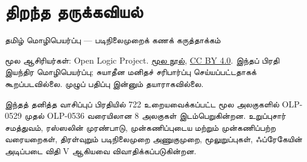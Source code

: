 \documentclass[11pt,a4paper,openany]{memoir}
\begin{document}
\raggedright
\pagestyle{plain}
\chapter*{திறந்த தருக்கவியல்}
\noindent தமிழ் மொழிபெயர்ப்பு — படிநிலைமுறைக் கணக் கருத்தாக்கம்

\noindent மூல ஆசிரியர்கள்: Open Logic Project.
\href{https://github.com/OpenLogicProject/OpenLogic}{மூல நூல்},
\href{https://creativecommons.org/licenses/by/4.0/}{CC BY 4.0}.
இந்தப் பிரதி இயந்திர மொழிபெயர்ப்பு; சுயாதீன மனிதச் சரிபார்ப்பு செய்யப்பட்டதாகக்
கூறப்படவில்லை. முழுப் பதிப்பு இன்னும் தயாராகவில்லை.

\noindent இந்தத் தனித்த வாசிப்புப் பிரதியில் 722 உறையவைக்கப்பட்ட மூல
அலகுகளில் OLP-0529 முதல் OLP-0536 வரையிலான 8 அலகுகள் இடம்பெறுகின்றன.
உறுப்புசார் சமத்துவம், ரஸ்ஸலின் முரண்பாடு, முன்கணிப்புடைய மற்றும்
முன்கணிப்பற்ற வரையறைகள், திரள்வுறும் படிநிலைமுறை அணுகுமுறை,
மூலுறுப்புகள், ஃப்ரேகேயின் அடிப்படை விதி V ஆகியவை விவாதிக்கப்படுகின்றன.

\clearpage
\tableofcontents*



\end{document}
